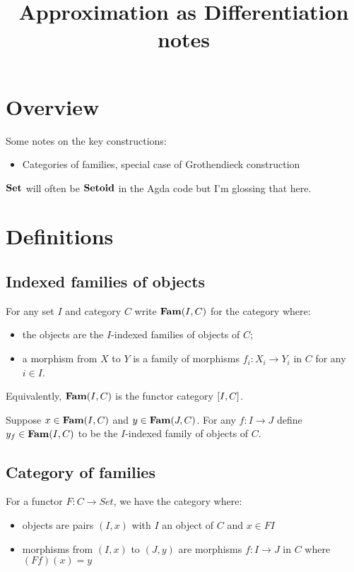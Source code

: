 \documentclass{acmart}
\begin{document}
\title{Approximation as Differentiation notes}
\maketitle

\section{Overview}

Some notes on the key constructions:
\begin{itemize}
\item Categories of families, special case of Grothendieck construction
\end{itemize}

\noindent $\mathbf{Set}$ will often be $\mathbf{Setoid}$ in the Agda code but I'm glossing that here.

\section{Definitions}

\subsection{Indexed families of objects}

For any set $I$ and category $C$ write $\mathbf{Fam}(I,C)$ for the category where:
\begin{itemize}
\item the objects are the $I$-indexed families of objects of $C$;
\item a morphism from $X$ to $Y$ is a family of morphisms $f_i: X_i \to Y_i$ in $C$ for any $i \in I$.
\end{itemize}

\noindent Equivalently, $\mathbf{Fam}(I,C)$ is the functor category $[I,C]$.

\noindent Suppose $x \in \mathbf{Fam}(I,C)$ and $y \in \mathbf{Fam}(J,C)$. For any $f: I \to J$ define $y_f \in \mathbf{Fam}(I,C)$ to
be the $I$-indexed family of objects of $C$.

\subsection{Category of families}

For a functor $F: C \to Set$, we have the category where:
\begin{itemize}
\item objects are pairs $(I, x)$ with $I$ an object of $C$ and $x \in FI$
\item morphisms from $(I, x)$ to $(J, y)$ are morphisms $f: I \to J$ in $C$ where $(Ff)(x) = y$
\end{itemize}
\end{document}
